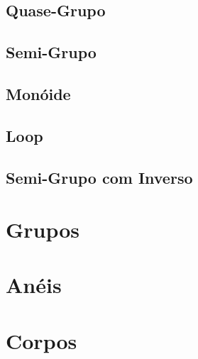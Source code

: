 \documentclass[twoside]{amsart}
\numberwithin{equation}{section}
\begin{document}
\subsection{Quase-Grupo}

\subsection{Semi-Grupo}

\subsection{Monóide}

\subsection{Loop}

\subsection{Semi-Grupo com Inverso}



\section{Grupos}



\section{Anéis}



\section{Corpos}
\end{document}
